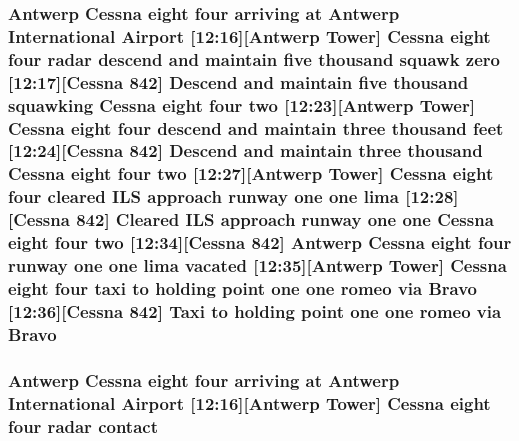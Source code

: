 \subsubsection[{\texorpdfstring{Bravo}{Bravo}}]{\setlength{\rightskip}{0pt plus 5cm}Antwerp {\bf Cessna} eight four arriving at Antwerp International {\bf Airport} \mbox{[}12\+:16\mbox{]}\mbox{[}Antwerp {\bf Tower}\mbox{]} {\bf Cessna} eight four radar descend and maintain five {\bf thousand} squawk {\bf zero} \mbox{[}12\+:17\mbox{]}\mbox{[}{\bf Cessna} 842\mbox{]} Descend and maintain five {\bf thousand} {\bf squawking} {\bf Cessna} eight four {\bf two} \mbox{[}12\+:23\mbox{]}\mbox{[}Antwerp {\bf Tower}\mbox{]} {\bf Cessna} eight four descend and maintain three {\bf thousand} {\bf feet} \mbox{[}12\+:24\mbox{]}\mbox{[}{\bf Cessna} 842\mbox{]} Descend and maintain three {\bf thousand} {\bf Cessna} eight four {\bf two} \mbox{[}12\+:27\mbox{]}\mbox{[}Antwerp {\bf Tower}\mbox{]} {\bf Cessna} eight four cleared I\+LS approach runway {\bf one} {\bf one} {\bf lima} \mbox{[}12\+:28\mbox{]}\mbox{[}{\bf Cessna} 842\mbox{]} Cleared I\+LS approach runway {\bf one} {\bf one} {\bf Cessna} eight four {\bf two} \mbox{[}12\+:34\mbox{]}\mbox{[}{\bf Cessna} 842\mbox{]} Antwerp {\bf Cessna} eight four runway {\bf one} {\bf one} {\bf lima} vacated \mbox{[}12\+:35\mbox{]}\mbox{[}Antwerp {\bf Tower}\mbox{]} {\bf Cessna} eight four taxi to holding point {\bf one} {\bf one} {\bf romeo} via Bravo \mbox{[}12\+:36\mbox{]}\mbox{[}{\bf Cessna} 842\mbox{]} Taxi to holding point {\bf one} {\bf one} {\bf romeo} via Bravo}\hypertarget{happyDay2ExpectedATC_8txt_acb3d304c3ed17a69007f1a5f35b55c6f}{}\label{happyDay2ExpectedATC_8txt_acb3d304c3ed17a69007f1a5f35b55c6f}
\subsubsection[{\texorpdfstring{contact}{contact}}]{\setlength{\rightskip}{0pt plus 5cm}Antwerp {\bf Cessna} eight four arriving at Antwerp International {\bf Airport} \mbox{[}12\+:16\mbox{]}\mbox{[}Antwerp {\bf Tower}\mbox{]} {\bf Cessna} eight four radar contact}\hypertarget{happyDay2ExpectedATC_8txt_aabccce409c3b74e74ea0c068d4a73f10}{}\label{happyDay2ExpectedATC_8txt_aabccce409c3b74e74ea0c068d4a73f10}
